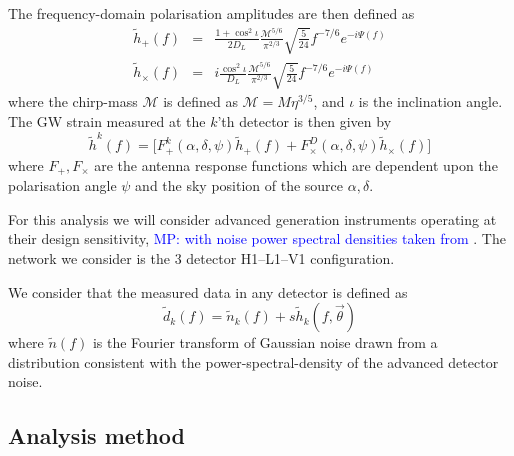 \documentclass[12pt]{iopart}
\newcommand{\gws}{\tilde{h}}
\newcommand{\MP}[1]{\textcolor{blue}{MP: #1}}
\begin{document}
The frequency-domain polarisation amplitudes are then defined as
%
\begin{eqnarray}
  \gws_{+}(f) &=& \frac{1+\cos^{2}\iota}{2D_{L}}
\frac{\mathcal{M}^{5/6}}{\pi^{2/3}}
\sqrt{\frac{5}{24}}f^{-7/6}e^{-i\Psi(f)}\\
  \gws_{\times}(f) &=&
 i\frac{\cos^{2}\iota}{D_{L}}\frac{\mathcal{M}^{5/6}}{\pi^{2/3}}
\sqrt{\frac{5}{24}}f^{-7/6}e^{-i\Psi(f)}
\end{eqnarray}
%
where the chirp-mass $\mathcal{M}$ is defined as $\mathcal{M}=M\eta^{3/5}$,
and $\iota$ is the inclination angle.  The \ac{GW} strain measured
at the $k$'th detector is then given by
%
\begin{equation}
  \label{eq:gravsig}
   \gws^{k}(f) = \big[ F_{+}^{k}(\alpha, \delta, \psi)\gws_{+}(f) +
F_{\times}^D(\alpha, \delta, \psi)\gws_{\times}(f)\big]
\end{equation}
%
where $F_{+},F_{\times}$ are the antenna response functions which are dependent
upon the polarisation angle $\psi$ and the sky position of the source
$\alpha,\delta$.

For this analysis we will consider advanced generation instruments operating
at their design sensitivity, \MP{with noise power spectral densities taken from
\cite{2013arXiv1304.0670L}}. The network we consider is the 3 detector H1--L1--V1 configuration. 

We consider that the measured data in any detector is defined as
%
\begin{equation}
  \tilde{d}_{k}(f)=\tilde{n}_{k}(f)+s\gws_{k}(f,\vec{\theta})
\end{equation}
%
where $\tilde{n}(f)$ is the Fourier transform of Gaussian noise drawn from a
distribution consistent with the power-spectral-density of the advanced
detector noise. 

\subsection{Analysis method}
\end{document}
